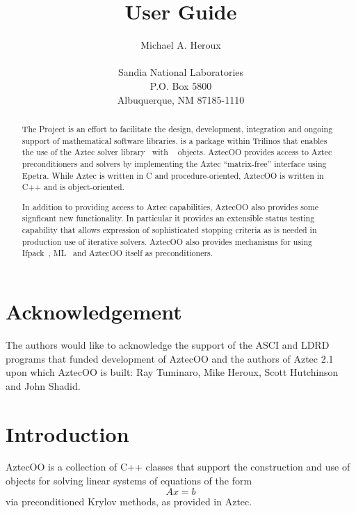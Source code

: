 \documentclass[12pt,relax]{AztecOOUserGuide}
\title{\AztecOOTM{} User Guide}
\author{Michael A. Heroux \\
	\\
	    Sandia National Laboratories\\
	    P.O. Box 5800\\
	    Albuquerque, NM 87185-1110 
	 }
\date{} %
\begin{document}
\maketitle

\begin{abstract}

The \TrilinosTM{} Project is an effort to facilitate the design, development,
integration and ongoing support of mathematical software libraries.
\AztecOOTM{} is a package within Trilinos that enables the use of the Aztec solver 
library~\cite{Aztec2.1} with \EpetraTM{}~\cite{Epetra-Users-Guide} objects.  
AztecOO provides access to Aztec preconditioners and solvers by
implementing the Aztec ``matrix-free'' interface using Epetra.
While Aztec is written in C and procedure-oriented, 
AztecOO is written in C++ and is object-oriented.

In addition to providing access to Aztec capabilities, AztecOO also
provides some signficant new functionality.  In particular it provides
an extensible status testing capability that allows expression of
sophisticated stopping criteria as is needed in production use of
iterative solvers.  AztecOO also provides mechanisms for using 
Ifpack~\cite{Ifpack-Ref-Guide}, ML~\cite{ML-home-page} and AztecOO
itself as preconditioners.
\end{abstract}


\section*{Acknowledgement}
The authors would like to acknowledge the support of the ASCI and LDRD 
programs that funded development of AztecOO and the authors of Aztec
2.1 upon which AztecOO is built: Ray Tuminaro, Mike Heroux, Scott
Hutchinson and John Shadid.  

\clearpage
\tableofcontents
\listoffigures

\clearpage

\section{Introduction}
\label{Section:Introduction}

AztecOO is a collection of C++ classes that support the construction
and use of objects for solving linear systems of equations of the form
\begin{equation}
\label{e:axb}
Ax = b
\end{equation}
via
preconditioned Krylov methods, as provided in Aztec.
\end{document}
